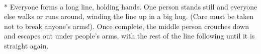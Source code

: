 \begin{minipage}{\textwidth}
\\*
Everyone forms a long line, holding hands.  One person stands still and everyone else walks or runs around, winding the line up in a big hug.  (Care must be taken not to break anyone's arms!).  Once complete, the middle person crouches down and escapes out under people's arms, with the rest of the line following until it is straight again.
\end{minipage}    \vfill
